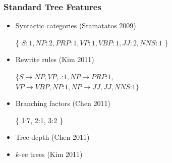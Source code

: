 \documentclass[handouti]{beamer}
\begin{document}
\begin{frame}[fragile]
    \frametitle{Standard Tree Features}
    \begin{itemize}
        \itemsep1em
        \item Syntactic categories {\normalsize (Stamatatos 2009)}
    
            \begin{center}
            {\small
                \{ $S:1, NP:2, PRP:1, VP:1, VBP:1, JJ:2, NNS:1$ \}
            }
            \end{center}
        \item Rewrite rules {\normalsize (Kim 2011)}

             \begin{center}
            {\small
                $\{ S\rightarrow NP,VP,.$:$1, NP \rightarrow PRP$:$1,$ \\$
                VP\rightarrow VBP,NP$:$1, NP \rightarrow JJ,JJ,NNS$:$1 \}$
            }
            \end{center}
            \item Branching factors {\normalsize (Chen 2011)}
            
            \begin{center}
            {\small
                \{ 1:7, 2:1, 3:2 \}
            }
            \end{center}
    \item Tree depth {\normalsize (Chen 2011)}
            

        \item $k$-ee trees {\normalsize (Kim 2011)}
    \end{itemize}
\end{frame}

\end{document}
